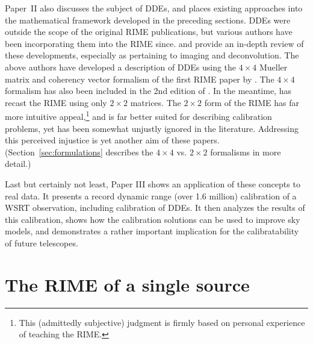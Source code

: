 \documentclass[referee]{aa}
\begin{document}
Paper~II also discusses the subject of DDEs, and places existing approaches into the mathematical framework developed in the preceding sections. DDEs were outside the scope of the original RIME publications, but various authors have been incorporating them into the RIME since. \citet{Rau:DDEs} and \citet{SB:calibration-low-freq} provide an in-depth review of these developments, especially as pertaining to imaging and deconvolution. The above authors have developed a description of DDEs using the $4\times4$ Mueller matrix and coherency vector formalism of the first RIME paper by \citet{ME1}. The $4\times4$ formalism has also been included in the 2nd edition of \citet*[Sect.~4.8]{tms}. In the meantime, \citet{ME4} has recast the RIME using only $2\times2$ matrices. The $2\times2$ form of the RIME has far more intuitive appeal,\footnote{This (admittedly subjective) judgment is firmly based on personal experience of teaching the RIME.} and is far better suited for describing calibration problems, yet has been somewhat unjustly ignored in the literature. Addressing this perceived injustice is yet another aim of these papers. (Section~\ref{sec:formulations} describes the $4\times4$ vs. $2\times2$ formalisms in more detail.)

Last but certainly not least, Paper III shows an application of these concepts to real data. It presents a record dynamic range (over 1.6 million) calibration of a WSRT observation, including calibration of DDEs. It then analyzes the results of this calibration, shows how the calibration solutions can be used to improve sky models, and demonstrates a rather important implication for the calibratability of future telescopes.

\section{The RIME of a single source\label{sec:me-single-source}}
\label{sec:derivation}
\end{document}
